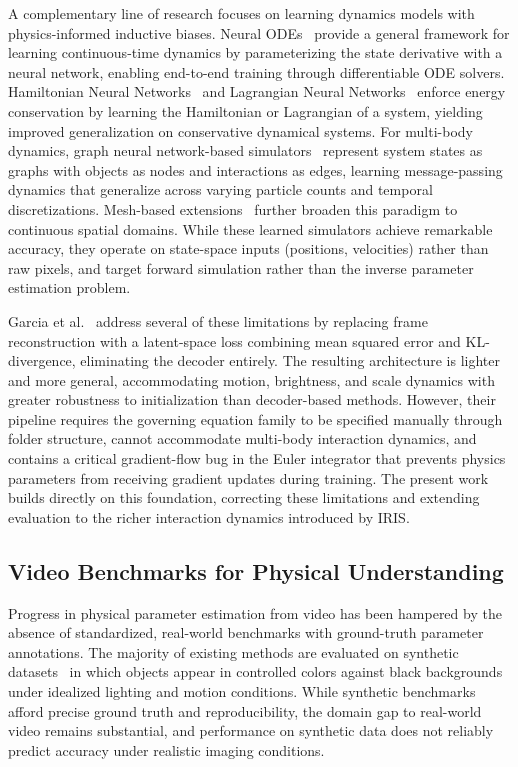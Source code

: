\documentclass[runningheads]{llncs}
\begin{document}
A complementary line of research focuses on learning dynamics models with physics-informed inductive biases. Neural ODEs~\cite{chen2018neural} provide a general framework for learning continuous-time dynamics by parameterizing the state derivative with a neural network, enabling end-to-end training through differentiable ODE solvers. Hamiltonian Neural Networks~\cite{greydanus2019hamiltonian} and Lagrangian Neural Networks~\cite{cranmer2020lagrangian} enforce energy conservation by learning the Hamiltonian or Lagrangian of a system, yielding improved generalization on conservative dynamical systems. For multi-body dynamics, graph neural network-based simulators~\cite{sanchez2020learning, battaglia2016interaction} represent system states as graphs with objects as nodes and interactions as edges, learning message-passing dynamics that generalize across varying particle counts and temporal discretizations. Mesh-based extensions~\cite{pfaff2021learning} further broaden this paradigm to continuous spatial domains. While these learned simulators achieve remarkable accuracy, they operate on state-space inputs (positions, velocities) rather than raw pixels, and target forward simulation rather than the inverse parameter estimation problem.

Garcia et al.~\cite{garcia2025learning} address several of these limitations by replacing frame reconstruction with a latent-space loss combining mean squared error and KL-divergence, eliminating the decoder entirely. The resulting architecture is lighter and more general, accommodating motion, brightness, and scale dynamics with greater robustness to initialization than decoder-based methods. However, their pipeline requires the governing equation family to be specified manually through folder structure, cannot accommodate multi-body interaction dynamics, and contains a critical gradient-flow bug in the Euler integrator that prevents physics parameters from receiving gradient updates during training. The present work builds directly on this foundation, correcting these limitations and extending evaluation to the richer interaction dynamics introduced by IRIS.


\subsection{Video Benchmarks for Physical Understanding}
\label{sec:related_benchmarks}

Progress in physical parameter estimation from video has been hampered by the absence of standardized, real-world benchmarks with ground-truth parameter annotations. The majority of existing methods are evaluated on synthetic datasets~\cite{de2018end, jaques2019physics, velivckovic2022reasoning, watters2017visual, yang2022learning, zheng2018unsupervised} in which objects appear in controlled colors against black backgrounds under idealized lighting and motion conditions. While synthetic benchmarks afford precise ground truth and reproducibility, the domain gap to real-world video remains substantial, and performance on synthetic data does not reliably predict accuracy under realistic imaging conditions.
\end{document}

